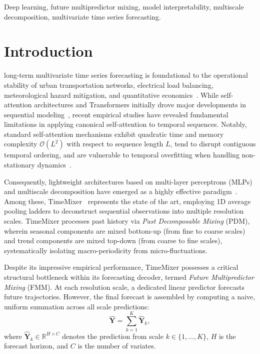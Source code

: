 \documentclass[journal]{IEEEtran}
\begin{document}
\begin{IEEEkeywords}
Deep learning, future multipredictor mixing, model interpretability, multiscale decomposition, multivariate time series forecasting.
\end{IEEEkeywords}

\IEEEpeerreviewmaketitle

\section{Introduction}

 long-term multivariate time series forecasting is foundational to the operational stability of urban transportation networks, electrical load balancing, meteorological hazard mitigation, and quantitative economics~\cite{zhou2021informer, wu2021autoformer}. While self-attention architectures and Transformers initially drove major developments in sequential modeling~\cite{vaswani2017attention, zhou2022fedformer, nie2023patchtst}, recent empirical studies have revealed fundamental limitations in applying canonical self-attention to temporal sequences. Notably, standard self-attention mechanisms exhibit quadratic time and memory complexity $\mathcal{O}(L^2)$ with respect to sequence length $L$, tend to disrupt contiguous temporal ordering, and are vulnerable to temporal overfitting when handling non-stationary dynamics~\cite{zeng2023dlinear}.

Consequently, lightweight architectures based on multi-layer perceptrons (MLPs) and multiscale decomposition have emerged as a highly effective paradigm~\cite{liu2022scinet, zhang2023crossformer}. Among these, TimeMixer~\cite{wang2024timemixer} represents the state of the art, employing 1D average pooling ladders to deconstruct sequential observations into multiple resolution scales. TimeMixer processes past history via \textit{Past Decomposable Mixing} (PDM), wherein seasonal components are mixed bottom-up (from fine to coarse scales) and trend components are mixed top-down (from coarse to fine scales), systematically isolating macro-periodicity from micro-fluctuations.

Despite its impressive empirical performance, TimeMixer possesses a critical structural bottleneck within its forecasting decoder, termed \textit{Future Multipredictor Mixing} (FMM). At each resolution scale, a dedicated linear predictor forecasts future trajectories. However, the final forecast is assembled by computing a naive, uniform summation across all scale predictions:
\begin{equation}
\label{eq:baseline_sum}
\hat{\mathbf{Y}} = \sum_{k=1}^{K} \hat{\mathbf{Y}}_k,
\end{equation}
where $\hat{\mathbf{Y}}_k \in \mathbb{R}^{H \times C}$ denotes the prediction from scale $k \in \{1, \dots, K\}$, $H$ is the forecast horizon, and $C$ is the number of variates.
\end{document}
